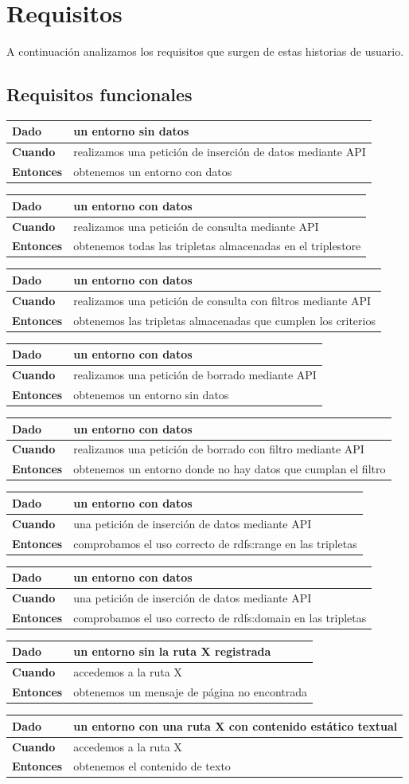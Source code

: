 \documentclass[12pt]{report} %
\begin{document}
\section{Requisitos}

A continuación analizamos los requisitos que surgen de estas historias de usuario.

\subsection{Requisitos funcionales}
\newcommand{\req}[3]{
    \begin{table}[]
        \begin{tabular}{|l|l|}
        \hline
        \textbf{Dado}     & #1 \\ \hline
        \textbf{Cuando}   & #2 \\ \hline
        \textbf{Entonces} & #3 \\ \hline
        \end{tabular}
    \end{table}
}

\req{un entorno sin datos}
{realizamos una petición de inserción de datos mediante API}
{obtenemos un entorno con datos}

\req{un entorno con datos}
{realizamos una petición de consulta mediante API}
{obtenemos todas las tripletas almacenadas en el triplestore}

\req{un entorno con datos}
{realizamos una petición de consulta con filtros mediante API}
{obtenemos las tripletas almacenadas que cumplen los criterios}

\req{un entorno con datos}
{realizamos una petición de borrado mediante API}
{obtenemos un entorno sin datos}

\req{un entorno con datos}
{realizamos una petición de borrado con filtro mediante API}
{obtenemos un entorno donde no hay datos que cumplan el filtro}

\req{un entorno con datos}
{una petición de inserción de datos mediante API}
{comprobamos el uso correcto de rdfs:range en las tripletas}

\req{un entorno con datos}
{una petición de inserción de datos mediante API}
{comprobamos el uso correcto de rdfs:domain en las tripletas}

\req{un entorno sin la ruta X registrada}
{accedemos a la ruta X}
{obtenemos un mensaje de página no encontrada}

\req{un entorno con una ruta X con contenido estático textual}
{accedemos a la ruta X}
{obtenemos el contenido de texto}
\end{document}
